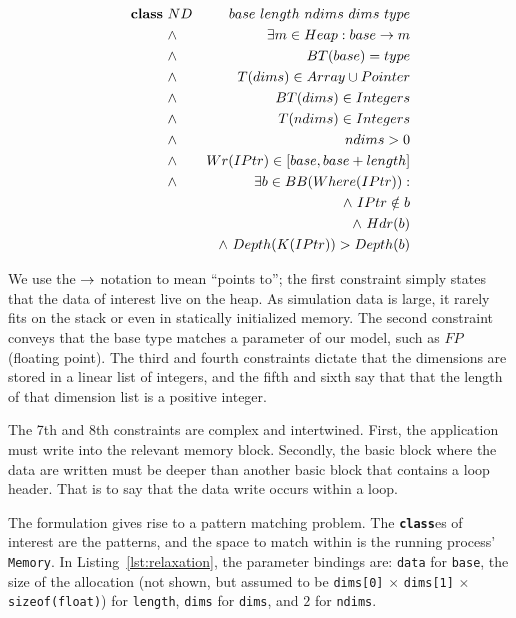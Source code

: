 \begin{eqnarray}
  \indent \textbf{class} \ & ND & \  base \  length \  ndims \  dims \  type
    \nonumber\\
  \indent &\land& \exists m \in Heap : base \pointsto m \\
  \indent &\land& BT(base) = type\\
  \indent &\land& T(dims) \in Array \union Pointer\\
  \indent &\land& BT(dims) \in Integers\\
  \indent &\land& T(ndims) \in Integers\\
  \indent &\land& ndims > 0\\
  \indent &\land& Wr(IPtr) \in [ base, base + length ]\\
  \indent &\land& \exists b \in BB(Where(IPtr)) : \nonumber\\
    && \land \ IPtr \notin b \nonumber \\
    && \land \ Hdr(b) \nonumber\\
    && \land \ Depth(K(IPtr)) > Depth(b)
\end{eqnarray}

We use the $\rightarrow$ notation to mean ``points to''; the first
constraint simply states that the data of interest live on the heap.
As simulation data is large, it rarely fits on the stack or even in
statically initialized memory.  The second constraint conveys that the
base type matches a parameter of our model, such as $FP$ (floating
point).  The third and fourth constraints dictate that the dimensions
are stored in a linear list of integers, and the fifth and sixth say
that that the length of that dimension list is a positive integer.

The 7th and 8th constraints are complex and intertwined.  First, the
application must write into the relevant memory block.  Secondly, the
basic block where the data are written must be deeper than another
basic block that contains a loop header.  That is to say that the data
write occurs within a loop.

The formulation gives rise to a pattern matching problem.  The
\texttt{\textbf{class}}es of interest are the patterns, and the space
to match within is the running process' \texttt{Memory}.
In Listing~\ref{lst:relaxation}, the parameter bindings are:
\texttt{data} for \texttt{base}, the size of the allocation (not shown, but
assumed to be \texttt{dims[0]} $\times$ \texttt{dims[1]} $\times$
\texttt{sizeof(float)}) for
\texttt{length}, \texttt{dims} for \texttt{dims}, and $2$ for
\texttt{ndims}.

